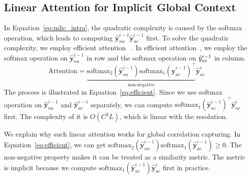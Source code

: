 \documentclass{article}
\theoremstyle{plain}
\theoremstyle{definition}
\theoremstyle{remark}
\begin{document}
  \subsection{Linear Attention for Implicit Global Context}
  \label{sec:method:linear}
  In Equation~\ref{eq:mlic_intra}, 
  the quadratic complexity is caused by the softmax operation, which
  leads to computing $\hat{\boldsymbol{y}}^{i-1}_{na}\hat{\boldsymbol{y}}^{i-1}_{ac}$ first.
  To solve the quadratic complexity, we employ efficient attention
  ~\cite{shen2021efficient}.
  In efficient attention~\cite{shen2021efficient}, 
  we employ the softmax operation on $\hat{\boldsymbol{y}}^{i-1}_{na}$ in 
  row and the softmax operation on $\hat{\boldmath{y}}^{i-1}_{ac}$ in 
  column.
  \begin{equation}
      \textrm{Attention} = \underbrace{\textrm{softmax}_2\left(\hat{\boldsymbol{y}}^{i-1}_{na}\right)\textrm{softmax}_1\left(\hat{\boldsymbol{y}}^{i-1}_{ac}\right)^{\top}}_{\textrm{non-negative}}\hat{\boldsymbol{y}}^i_{ac}
      \label{eq:efficient}
  \end{equation}
  The process is illustrated in Equation~\ref{eq:efficient}.
  Since we use softmax operation on $\hat{\boldsymbol{y}}^{i-1}_{na}$ and 
  $\hat{\boldsymbol{y}}^{i-1}_{ac}$ separately, we can compute
  $\textrm{softmax}_1\left(\hat{\boldsymbol{y}}^{i-1}_{ac}\right)^{\top}\hat{\boldsymbol{y}}^{i}_{ac}$ first.
  The complexity of it is $O(C^2L)$, which is linear with the resolution.\par
  We explain why such linear attention works for global correlation capturing.
  In Equation~\ref{eq:efficient}, we can get
  $\textrm{softmax}_2\left(\hat{\boldsymbol{y}}^{i-1}_{na}\right)\textrm{softmax}_1\left(\hat{\boldsymbol{y}}^{i-1}_{ac}\right) \geq 0$.
  The non-negative property makes it can be treated as a similarity metric.
  The metric is implicit  because we compute
  $\textrm{softmax}_1\left(\hat{\boldsymbol{y}}^{i-1}_{ac}\right)\hat{\boldsymbol{y}}^{i}_{ac}$ first
  in practice.
\end{document}
